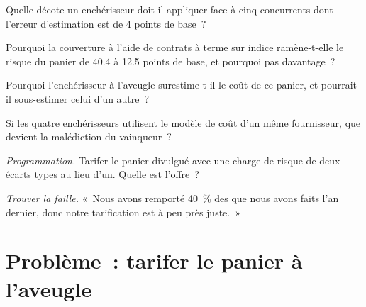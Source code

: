 \begin{exercise}[$\star$]\label{exo:mx:portfolio-trades-and-risk-bids:3}
Quelle décote un enchérisseur doit-il appliquer face à cinq concurrents dont l'erreur d'estimation est de 4 points de base~?
\end{exercise}

\begin{exercise}[$\star\star$]\label{exo:mx:portfolio-trades-and-risk-bids:4}
Pourquoi la couverture à l'aide de contrats à terme sur indice ramène-t-elle le risque du panier de 40.4 à 12.5 points de base, et pourquoi pas davantage~?
\end{exercise}

\begin{exercise}[$\star\star$]\label{exo:mx:portfolio-trades-and-risk-bids:5}
Pourquoi l'enchérisseur à l'aveugle surestime-t-il le coût de ce panier, et pourrait-il sous-estimer celui d'un autre~?
\end{exercise}

\begin{exercise}[$\star\star$]\label{exo:mx:portfolio-trades-and-risk-bids:6}
Si les quatre enchérisseurs utilisent le modèle de coût d'un même fournisseur, que devient la malédiction du vainqueur~?
\end{exercise}

\begin{exercise}[$\star\star\star$]\label{exo:mx:portfolio-trades-and-risk-bids:7}
\emph{Programmation.} Tarifer le panier divulgué avec une charge de risque de deux écarts types au lieu d'un. Quelle est l'offre~?
\end{exercise}

\begin{exercise}[$\star\star\star$]\label{exo:mx:portfolio-trades-and-risk-bids:8}
\emph{Trouver la faille.} «~Nous avons remporté 40~\% des  que nous avons faits l'an dernier, donc notre tarification est à peu près juste.~»
\end{exercise}

\section{Problème~: tarifer le panier à l'aveugle}

